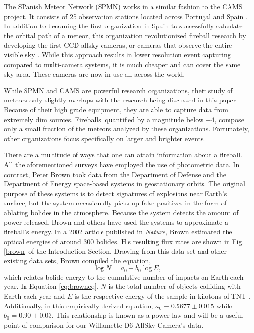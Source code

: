The SPanish Meteor Network (SPMN) works in a similar fashion to the CAMS project.  
It consists of 25 observation stations located across Portugal and Spain \cite{trigo-rodriguez_2006_2007}.
In addition to becoming the first organization in Spain to successfully calculate the orbital path of a meteor, this organization revolutionized fireball research by developing the first CCD allsky cameras, or cameras that observe the entire visible sky \cite{jordi_l._pique_presentation_nodate}.
While this approach results in lower resolution event capturing compared to multi-camera systems, it is much cheaper and can cover the same sky area.
These cameras are now in use all across the world.

While SPMN and CAMS are powerful research organizations, their study of meteors only slightly overlaps with the research being discussed in this paper.
Because of their high grade equipment, they are able to capture data from extremely dim sources.
Fireballs, quantified by a magnitude below $-4$, compose only a small fraction of the meteors analyzed by these organizations.
Fortunately, other organizations focus specifically on larger and brighter events.

There are a multitude of ways that one can attain information about a fireball.  
All the aforementioned surveys have employed the use of photometric data.
In contrast, Peter Brown took data from the Department of Defense and the Department of Energy space-based systems in geostationary orbits.
The original purpose of these systems is to detect signatures of explosions near Earth's surface, but the system occasionally picks up false positives in the form of ablating bolides in the atmosphere.  
Because the system detects the amount of power released, Brown and others have used the systems to approximate a fireball's energy.
In a 2002 article published in \textit{Nature}, Brown estimated the optical energies of around 300 bolides.
His resulting flux rates are shown in Fig.\ref{brown} of the Introduction Section.
Drawing from this data set and other existing data sets, Brown compiled the equation,
\begin{equation}
\log N = a_0 - b_0\log E,
\label{eq:browneq}
\end{equation}
which relates bolide energy to the cumulative number of impacts on Earth each year. 
In Equation \ref{eq:browneq}, $N$ is the total number of objects colliding with Earth each year and $E$ is the respective energy of the sample in kilotons of TNT \cite{brown_p_flux_2002}.
Additionally, in this empirically derived equation, $a_0 = 0.5677 \pm 0.015$ while $b_0 = 0.90 \pm 0.03$.
This relationship is known as a power law and will be a useful point of comparison for our Willamette D6 AllSky Camera's data.


